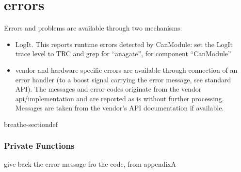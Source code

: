 \documentclass[a4paper,10pt,english]{sphinxmanual}
\begin{document}
\section{errors}
\label{\detokenize{vendors/anagate:errors}}
\sphinxAtStartPar
Errors and problems are available through two mechanisms:
\begin{itemize}
\item {} 
\sphinxAtStartPar
LogIt. This reports runtime errors detected by CanModule:
set the LogIt trace level to TRC and grep for “anagate”, for component “CanModule”

\item {} 
\sphinxAtStartPar
vendor and hardware specific errors are available through connection of
an error handler (to a boost signal carrying the error message, see standard API).
The messages and error codes originate from the vendor api/implementation and are
reported as is without further processing. Messages are taken from the vendor’s API
documentation if available.

\end{itemize}

\begin{fulllineitems}
%
\pysigstartmultiline
{}%
\pysigstopmultiline
\begin{sphinxuseclass}{breathe-sectiondef}\subsubsection*{Private Functions}

\begin{fulllineitems}
\label{\detokenize{vendors/anagate:_CPPv4N10AnaCanScan19ana_canGetErrorTextEl}}%
\pysigstartmultiline
{}%
\pysigstopmultiline
\sphinxAtStartPar
give back the error message fro the code, from appendixA 

\end{fulllineitems}


\end{sphinxuseclass}
\end{fulllineitems}
\end{document}
